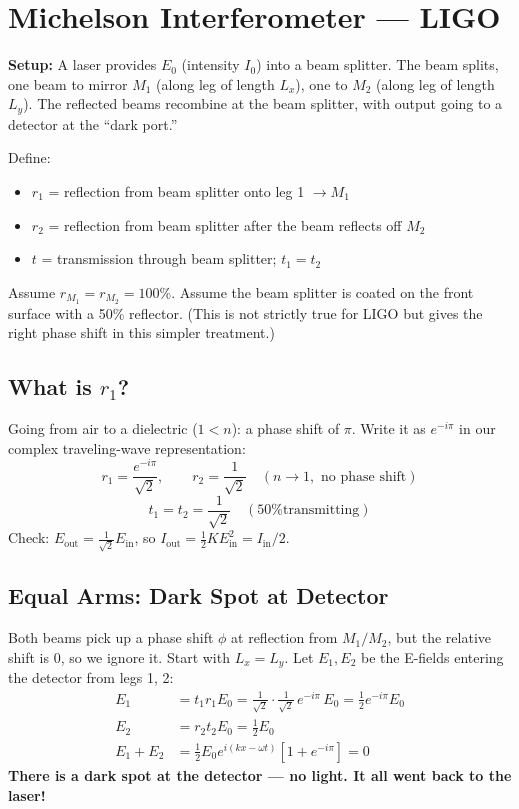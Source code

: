 \documentclass[11pt]{report}
\begin{document}
\section{Michelson Interferometer --- LIGO}

\textbf{Setup:} A laser provides $E_0$ (intensity $I_0$) into a beam splitter. The beam splits, one beam to mirror $M_1$ (along leg of length $L_x$), one to $M_2$ (along leg of length $L_y$). The reflected beams recombine at the beam splitter, with output going to a detector at the ``dark port.''

Define:
\begin{itemize}
    \item $r_1$ = reflection from beam splitter onto leg 1 $\to M_1$
    \item $r_2$ = reflection from beam splitter after the beam reflects off $M_2$
    \item $t$ = transmission through beam splitter; $t_1 = t_2$
\end{itemize}

Assume $r_{M_1} = r_{M_2} = 100\%$. Assume the beam splitter is coated on the front surface with a 50\% reflector. (This is not strictly true for LIGO but gives the right phase shift in this simpler treatment.)

\subsection*{What is $r_1$?}

Going from air to a dielectric ($1 < n$): a phase shift of $\pi$. Write it as $e^{-i\pi}$ in our complex traveling-wave representation:
\begin{equation}
r_1 = \frac{e^{-i\pi}}{\sqrt{2}}, \qquad r_2 = \frac{1}{\sqrt{2}} \quad (n \to 1, \text{ no phase shift})
\end{equation}
\begin{equation}
t_1 = t_2 = \frac{1}{\sqrt{2}} \quad (\text{50\% transmitting})
\end{equation}
Check: $E_{\text{out}} = \tfrac{1}{\sqrt{2}}E_{\text{in}}$, so $I_{\text{out}} = \tfrac{1}{2}KE_{\text{in}}^2 = I_{\text{in}}/2$.

\subsection*{Equal Arms: Dark Spot at Detector}

Both beams pick up a phase shift $\phi$ at reflection from $M_1/M_2$, but the relative shift is 0, so we ignore it. Start with $L_x = L_y$. Let $E_1, E_2$ be the E-fields entering the detector from legs 1, 2:
\begin{align}
E_1 &= t_1 r_1 E_0 = \frac{1}{\sqrt{2}}\cdot\frac{1}{\sqrt{2}}\,e^{-i\pi}\,E_0 = \tfrac{1}{2}e^{-i\pi}E_0 \\
E_2 &= r_2 t_2 E_0 = \tfrac{1}{2}E_0 \\
E_1 + E_2 &= \tfrac{1}{2}E_0 e^{i(kx-\omega t)}\!\left[1 + e^{-i\pi}\right] = 0
\end{align}
\textbf{There is a dark spot at the detector --- no light. It all went back to the laser!}
\end{document}
